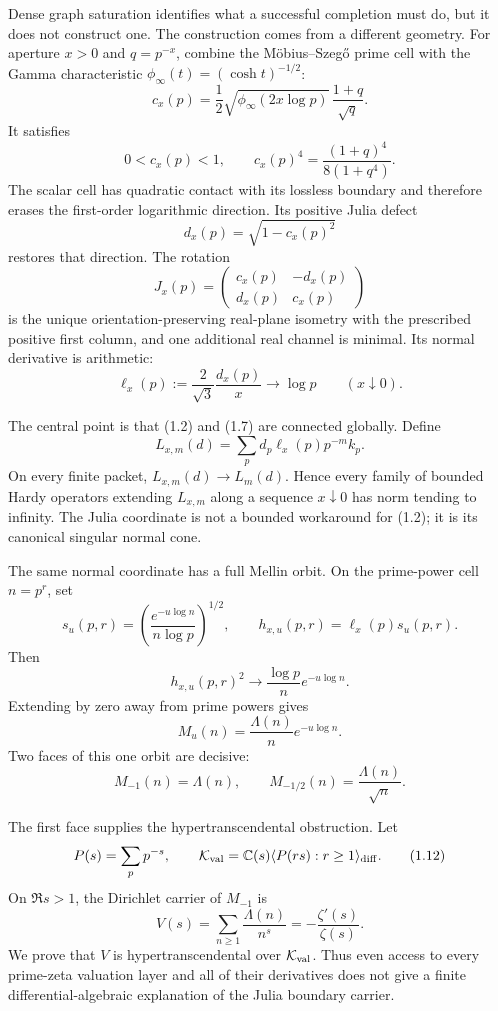 \documentclass[11pt]{article}
\theoremstyle{definition}
\theoremstyle{remark}
\newcommand{\C}{\mathbb C}
\newcommand{\cK}{\mathcal K}
\begin{document}
Dense graph saturation identifies what a successful completion must do, but it does not
construct one.  The construction comes from a different geometry.  For aperture \(x>0\) and
\(q=p^{-x}\), combine the M\"obius--Szeg\H{o} prime cell with the Gamma characteristic
\(\phi_\infty(t)=(\cosh t)^{-1/2}\):
\[
 c_x(p)=\frac12\sqrt{\phi_\infty(2x\log p)}\,\frac{1+q}{\sqrt q}. \tag{1.3}
\]
It satisfies
\[
 0<c_x(p)<1,\qquad
 c_x(p)^4=\frac{(1+q)^4}{8(1+q^4)}.                 \tag{1.4}
\]
The scalar cell has quadratic contact with its lossless boundary and therefore erases the
first-order logarithmic direction.  Its positive Julia defect
\[
 d_x(p)=\sqrt{1-c_x(p)^2}                            \tag{1.5}
\]
restores that direction.  The rotation
\[
 J_x(p)=
 \begin{pmatrix}
  c_x(p)&-d_x(p)\\
  d_x(p)& c_x(p)
 \end{pmatrix}                                      \tag{1.6}
\]
is the unique orientation-preserving real-plane isometry with the prescribed positive first
column, and one additional real channel is minimal.  Its normal derivative is arithmetic:
\[
 \ell_x(p):=\frac{2}{\sqrt3}\frac{d_x(p)}x
 \longrightarrow\log p\qquad(x\downarrow0).         \tag{1.7}
\]

The central point is that (1.2) and (1.7) are connected globally.  Define
\[
 L_{x,m}(d)=\sum_p d_p\ell_x(p)p^{-m}k_p.            \tag{1.8}
\]
On every finite packet, \(L_{x,m}(d)\to L_m(d)\).  Hence every family of bounded Hardy
operators extending \(L_{x,m}\) along a sequence \(x\downarrow0\) has norm tending to infinity.
The Julia coordinate is not a bounded workaround for (1.2); it is its canonical singular
normal cone.

The same normal coordinate has a full Mellin orbit.  On the prime-power cell \(n=p^r\), set
\[
 s_u(p,r)=
 \left(\frac{e^{-u\log n}}{n\log p}\right)^{1/2},
 \qquad h_{x,u}(p,r)=\ell_x(p)s_u(p,r).              \tag{1.9}
\]
Then
\[
 h_{x,u}(p,r)^2\longrightarrow
 \frac{\log p}{n}e^{-u\log n}.
\]
Extending by zero away from prime powers gives
\[
 M_u(n)=\frac{\Lambda(n)}n e^{-u\log n}.             \tag{1.10}
\]
Two faces of this one orbit are decisive:
\[
 M_{-1}(n)=\Lambda(n),\qquad
 M_{-1/2}(n)=\frac{\Lambda(n)}{\sqrt n}.             \tag{1.11}
\]

The first face supplies the hypertranscendental obstruction.  Let
\[
 P(s)=\sum_p p^{-s},\qquad
 \cK_{\rm val}=\C(s)\langle P(rs):r\ge1\rangle_{\rm diff}. \tag{1.12}
\]
On \(\Re s>1\), the Dirichlet carrier of \(M_{-1}\) is
\[
 V(s)=\sum_{n\ge1}\frac{\Lambda(n)}{n^s}
     =-\frac{\zeta'(s)}{\zeta(s)}.                  \tag{1.13}
\]
We prove that \(V\) is hypertranscendental over \(\cK_{\rm val}\).  Thus even access to every
prime-zeta valuation layer and all of their derivatives does not give a finite
differential-algebraic explanation of the Julia boundary carrier.
\end{document}
